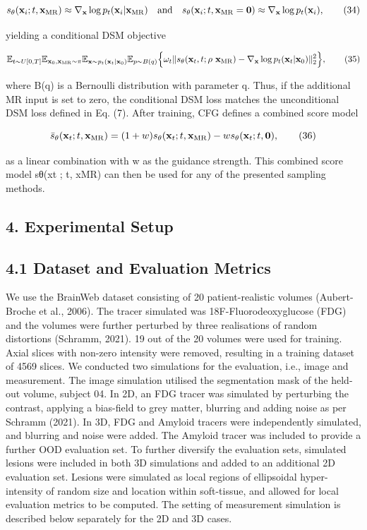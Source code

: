 \documentclass{article}
\begin{document}
$$s_{\theta}({\bf x}_{i};t,{\bf x}_{\rm MR})\approx\nabla_{\bf x}\log p_{t}({\bf x}_{i}|{\bf x}_{\rm MR})\quad\mbox{and}\quad s_{\theta}({\bf x}_{i};t,{\bf x}_{\rm MR}={\bf0})\approx\nabla_{\bf x}\log p_{t}({\bf x}_{i}),\tag{34}$$

yielding a conditional DSM objective

$$\mathbb{E}_{t\sim U[0,T]}\mathbb{E}_{\mathbf{x}_{0},\mathbf{x}_{\text{MR}}\sim\pi}\mathbb{E}_{\mathbf{x}\sim p_{t}(\mathbf{x}_{t}|\mathbf{x}_{0})}\mathbb{E}_{p\sim B(q)}\Big{\{}\omega_{t}\|s_{\theta}(\mathbf{x}_{t},t;\rho\ \mathbf{x}_{\text{MR}})-\nabla_{\mathbf{x}}\log p_{t}(\mathbf{x}_{t}|\mathbf{x}_{0})\|_{2}^{2}\Big{\}},\tag{35}$$

where B(q) is a Bernoulli distribution with parameter q. Thus, if the additional MR input is set to zero, the conditional DSM loss matches the unconditional DSM loss defined in Eq. (7). After training, CFG defines a combined score model

$$\bar{s}_{\theta}({\bf x}_{t};t,{\bf x}_{\rm MR})=(1+w)s_{\theta}({\bf x}_{t};t,{\bf x}_{\rm MR})-ws_{\theta}({\bf x}_{t};t,{\bf0}),\tag{36}$$

as a linear combination with w as the guidance strength. This combined score model sθ(xt ; t, xMR) can then be used for any of the presented sampling methods.

\subsection{4. Experimental Setup}

\subsection{4.1 Dataset and Evaluation Metrics}

We use the BrainWeb dataset consisting of 20 patient-realistic volumes (Aubert-Broche et al., 2006). The tracer simulated was 18F-Fluorodeoxyglucose (FDG) and the volumes were further perturbed by three realisations of random distortions (Schramm, 2021). 19 out of the 20 volumes were used for training. Axial slices with non-zero intensity were removed, resulting in a training dataset of 4569 slices. We conducted two simulations for the evaluation, i.e., image and measurement. The image simulation utilised the segmentation mask of the held-out volume, subject 04. In 2D, an FDG tracer was simulated by perturbing the contrast, applying a bias-field to grey matter, blurring and adding noise as per Schramm (2021). In 3D, FDG and Amyloid tracers were independently simulated, and blurring and noise were added. The Amyloid tracer was included to provide a further OOD evaluation set. To further diversify the evaluation sets, simulated lesions were included in both 3D simulations and added to an additional 2D evaluation set. Lesions were simulated as local regions of ellipsoidal hyper-intensity of random size and location within soft-tissue, and allowed for local evaluation metrics to be computed. The setting of measurement simulation is described below separately for the 2D and 3D cases.
\end{document}
